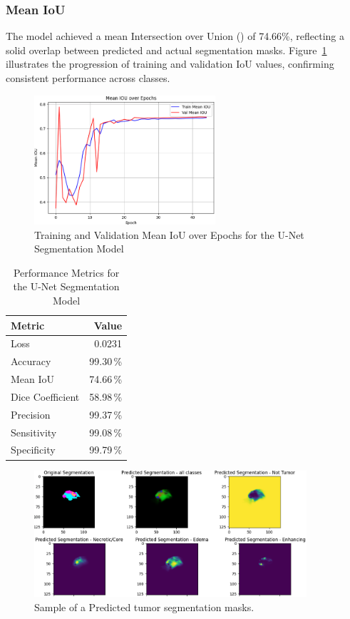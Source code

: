 \subsubsection{Mean IoU}
The model achieved a mean Intersection over Union () of 74.66\%, reflecting a solid overlap between predicted and actual segmentation masks. Figure~\ref{fig:unet-iou} illustrates the progression of training and validation IoU values, confirming consistent performance across classes.
\begin{figure}[h]
  \centering
  \includegraphics[width=0.6\textwidth]{Images/Chapter3/unet_iou.png}
  \caption{Training and Validation Mean IoU over Epochs for the U-Net Segmentation Model}
  \label{fig:unet-iou}
\end{figure}
\begin{table}[ht]
  \centering
  \caption{Performance Metrics for the U-Net Segmentation Model}
  \label{tab:segmentation-results}
  \begin{tabular}{l r}
    \hline
    \textbf{Metric}  & \textbf{Value} \\
    \hline
    Loss             & 0.0231         \\
    Accuracy         & 99.30\,\%      \\
    Mean IoU         & 74.66\,\%      \\
    Dice Coefficient & 58.98\,\%      \\
    Precision        & 99.37\,\%      \\
    Sensitivity      & 99.08\,\%      \\
    Specificity      & 99.79\,\%      \\
    \hline
  \end{tabular}
\end{table}

\begin{figure}[h]
  \centering
  \includegraphics[width=0.9\textwidth]{Images/Chapter3/seg.png}
  \caption{Sample of a Predicted tumor segmentation masks.}
  \label{fig:segmentation-example}
\end{figure}

